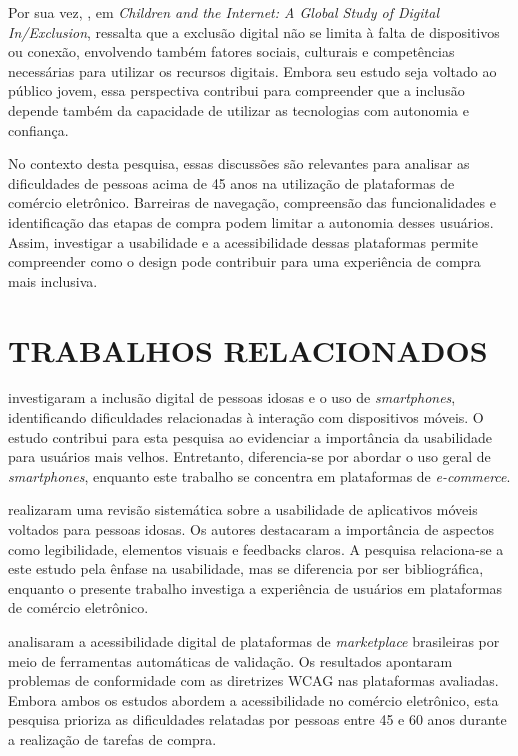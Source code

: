 \documentclass[12pt,a4paper]{article}
\begin{document}
Por sua vez, , em \textit{Children and the Internet: A Global Study of Digital In/Exclusion}, ressalta que a exclusão digital não se limita à falta de dispositivos ou conexão, envolvendo também fatores sociais, culturais e competências necessárias para utilizar os recursos digitais. Embora seu estudo seja voltado ao público jovem, essa perspectiva contribui para compreender que a inclusão depende também da capacidade de utilizar as tecnologias com autonomia e confiança.

No contexto desta pesquisa, essas discussões são relevantes para analisar as dificuldades de pessoas acima de 45 anos na utilização de plataformas de comércio eletrônico. Barreiras de navegação, compreensão das funcionalidades e identificação das etapas de compra podem limitar a autonomia desses usuários. Assim, investigar a usabilidade e a acessibilidade dessas plataformas permite compreender como o design pode contribuir para uma experiência de compra mais inclusiva.

\section{TRABALHOS RELACIONADOS}

 investigaram a inclusão digital de pessoas idosas e o uso de \textit{smartphones}, identificando dificuldades relacionadas à interação com dispositivos móveis. O estudo contribui para esta pesquisa ao evidenciar a importância da usabilidade para usuários mais velhos. Entretanto, diferencia-se por abordar o uso geral de \textit{smartphones}, enquanto este trabalho se concentra em plataformas de \textit{e-commerce}.

 realizaram uma revisão sistemática sobre a usabilidade de aplicativos móveis voltados para pessoas idosas. Os autores destacaram a importância de aspectos como legibilidade, elementos visuais e feedbacks claros. A pesquisa relaciona-se a este estudo pela ênfase na usabilidade, mas se diferencia por ser bibliográfica, enquanto o presente trabalho investiga a experiência de usuários em plataformas de comércio eletrônico.

 analisaram a acessibilidade digital de plataformas de \textit{marketplace} brasileiras por meio de ferramentas automáticas de validação. Os resultados apontaram problemas de conformidade com as diretrizes WCAG nas plataformas avaliadas. Embora ambos os estudos abordem a acessibilidade no comércio eletrônico, esta pesquisa prioriza as dificuldades relatadas por pessoas entre 45 e 60 anos durante a realização de tarefas de compra.
\end{document}
